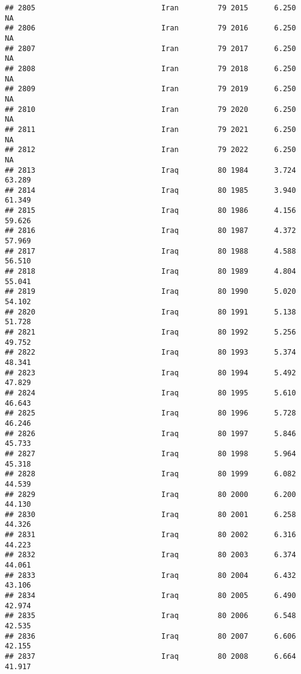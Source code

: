 \documentclass[
]{article}
\begin{document}
\begin{verbatim}
## 2805                             Iran         79 2015      6.250         NA
## 2806                             Iran         79 2016      6.250         NA
## 2807                             Iran         79 2017      6.250         NA
## 2808                             Iran         79 2018      6.250         NA
## 2809                             Iran         79 2019      6.250         NA
## 2810                             Iran         79 2020      6.250         NA
## 2811                             Iran         79 2021      6.250         NA
## 2812                             Iran         79 2022      6.250         NA
## 2813                             Iraq         80 1984      3.724     63.289
## 2814                             Iraq         80 1985      3.940     61.349
## 2815                             Iraq         80 1986      4.156     59.626
## 2816                             Iraq         80 1987      4.372     57.969
## 2817                             Iraq         80 1988      4.588     56.510
## 2818                             Iraq         80 1989      4.804     55.041
## 2819                             Iraq         80 1990      5.020     54.102
## 2820                             Iraq         80 1991      5.138     51.728
## 2821                             Iraq         80 1992      5.256     49.752
## 2822                             Iraq         80 1993      5.374     48.341
## 2823                             Iraq         80 1994      5.492     47.829
## 2824                             Iraq         80 1995      5.610     46.643
## 2825                             Iraq         80 1996      5.728     46.246
## 2826                             Iraq         80 1997      5.846     45.733
## 2827                             Iraq         80 1998      5.964     45.318
## 2828                             Iraq         80 1999      6.082     44.539
## 2829                             Iraq         80 2000      6.200     44.130
## 2830                             Iraq         80 2001      6.258     44.326
## 2831                             Iraq         80 2002      6.316     44.223
## 2832                             Iraq         80 2003      6.374     44.061
## 2833                             Iraq         80 2004      6.432     43.106
## 2834                             Iraq         80 2005      6.490     42.974
## 2835                             Iraq         80 2006      6.548     42.535
## 2836                             Iraq         80 2007      6.606     42.155
## 2837                             Iraq         80 2008      6.664     41.917

\end{verbatim}
\end{document}
